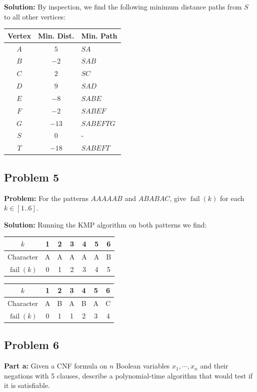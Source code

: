 \documentclass{article}
\begin{document}
\noindent\textbf{Solution:} By inspection, we find the following minimum distance paths from $S$ to all other vertices:
\begin{center}
  \begin{tabular}{c|c|l}
        Vertex & Min. Dist. & Min. Path \\
        \hline
        $A$ & $5$ & $SA$\\
        $B$ & $-2$ & $SAB$\\
        $C$ & $2$ & $SC$\\
        $D$ & $9$ & $SAD$\\
        $E$ & $-8$ & $SABE$\\
        $F$ & $-2$ & $SABEF$\\
        $G$ & $-13$ & $SABEFTG$\\
        $S$ & $0$ & -\\
        $T$ & $-18$ & $SABEFT$
  \end{tabular}
\end{center}

\subsection*{Problem 5}
\noindent\textbf{Problem:} For the patterns $AAAAAB$ and $ABABAC$, give $\operatorname{fail}(k)$ for each $k\in[1..6]$.
\bigskip

\noindent\textbf{Solution:} Running the KMP algorithm on both patterns we find:
\begin{center}
  \begin{tabular}{c|c|c|c|c|c|c}
        $k$&1&2&3&4&5&6 \\
        \hline
        Character&A&A&A&A&A&B\\
        \hline
        $\operatorname{fail}(k)$&0&1&2&3&4&5
  \end{tabular}\quad
  \begin{tabular}{c|c|c|c|c|c|c}
    $k$&1&2&3&4&5&6 \\
    \hline
    Character&A&B&A&B&A&C\\
    \hline
    $\operatorname{fail}(k)$&0&1&1&2&3&4
\end{tabular}
\end{center}


\subsection*{Problem 6}
\noindent\textbf{Part a:} Given a CNF formula on $n$ Boolean variables $x_1,\cdots,x_n$ and their negations with 5 clauses, describe a polynomial-time algorithm that would test if it is satisfiable.
\bigskip
\end{document}
